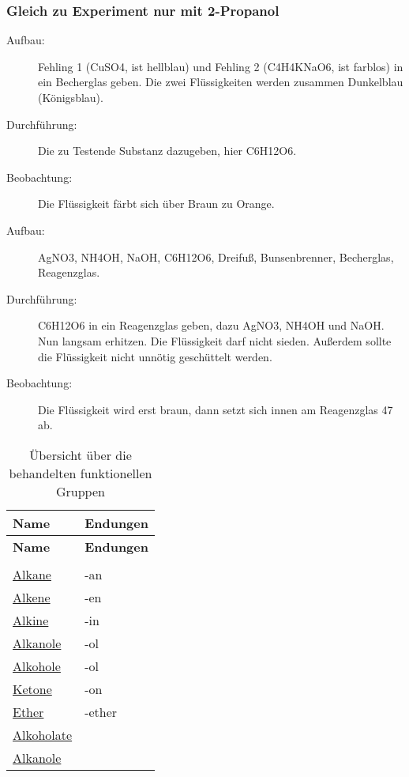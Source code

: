 \subsubsection{Gleich zu Experiment  nur mit 2-Propanol}
\chemsign{+}  \chemsign{\ce{->}}
 \chemsign{+}  \chemsign{+}

\begin{description}
	\item[Aufbau:] Fehling 1 (\ac{CuSO4}, ist hellblau)
		und Fehling 2 (\ac{C4H4KNaO6}, ist farblos) in ein Becherglas geben.
		Die zwei Flüssigkeiten werden zusammen Dunkelblau (Königsblau).
	\item[Durchführung:] Die zu Testende Substanz dazugeben, hier \ac{C6H12O6}.
	\item[Beobachtung:] Die Flüssigkeit färbt sich über Braun zu Orange.
\end{description}

\begin{description}
	\item[Aufbau:] \ac{AgNO3}, \ac{NH4OH}, \ac{NaOH}, \ac{C6H12O6}, Dreifuß, Bunsenbrenner,
		Becherglas, Reagenzglas.
	\item[Durchführung:] \ac{C6H12O6} in ein Reagenzglas geben,
		dazu \ac{AgNO3}, \ac{NH4OH} und \ac{NaOH}. Nun langsam erhitzen.
		Die Flüssigkeit darf nicht sieden.
		Außerdem sollte die Flüssigkeit nicht unnötig geschüttelt werden.
	\item[Beobachtung:] Die Flüssigkeit wird erst braun,
		dann setzt sich innen am Reagenzglas \ac{47} ab.
\end{description}


\renewcommand{\longtableheader}{\multicolumn{1}{l}{\textbf{Name}}
& \multicolumn{1}{l}{\textbf{Endungen}}
\\
}
\begin{longtable}{ll}
	\longtableheader
	\endfirsthead
	\longtableheader
	\endhead
	\caption{Übersicht über die behandelten funktionellen Gruppen}
	\endlastfoot
	\multicolumn{2}{r}{\longtableendfoot} \\
	\endfoot

	\hyperref[sec:Alkane:Definition]{Alkane}		& -an \\
	\hyperref[sec:Alkene]{Alkene}					& -en \\
	\hyperref[sec:Alkine]{Alkine}					& -in \\
	\hyperref[sec:Alkanole]{Alkanole}				& -ol \\
	\hyperref[sec:Alkanole]{Alkohole}				& -ol\fxwarning{true ???} \\
	\href{\WikiURL/Ketone}{Ketone}					& -on \\
	\href{\WikiURL/Ether}{Ether}					& -ether \\
	\href{\WikiURL/Alkoholate}{Alkoholate}			& \\
	\href{\WikiURL/Alkanole}{Alkanole}				& \\
\end{longtable}
